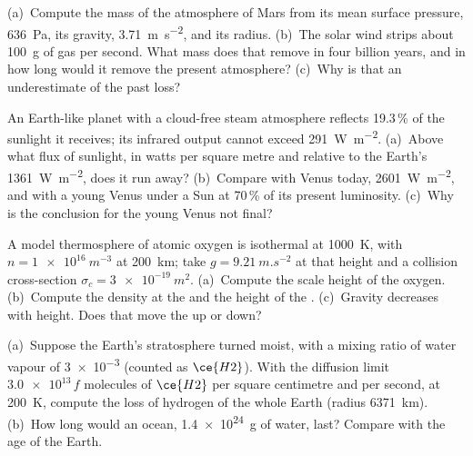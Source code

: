 \begin{exercise}[$\star\star$]\label{exo:b3:planetary-atmospheres:8}
(a)~Compute the mass of the atmosphere of Mars from its mean surface
pressure, \qty{636}{Pa}, its gravity, \qty{3.71}{m.s^{-2}}, and its
radius. (b)~The solar wind strips about \qty{100}{g} of gas per second.
What mass does that remove in four billion years, and in how long would
it remove the present atmosphere? (c)~Why is that an underestimate of the
past loss?
\end{exercise}

\begin{exercise}[$\star\star$]\label{exo:b3:planetary-atmospheres:9}
An Earth-like planet with a cloud-free steam atmosphere reflects 19.3\,\%
of the sunlight it receives; its infrared output cannot exceed
\qty{291}{W.m^{-2}}. (a)~Above what flux of sunlight, in watts per square
metre and relative to the Earth's \qty{1361}{W.m^{-2}}, does it run away?
(b)~Compare with Venus today, \qty{2601}{W.m^{-2}}, and with a young Venus
under a Sun at 70\,\% of its present luminosity. (c)~Why is the
conclusion for the young Venus not final?
\end{exercise}

\begin{exercise}[$\star\star\star$]\label{exo:b3:planetary-atmospheres:10}
A model thermosphere of atomic oxygen is isothermal at \qty{1000}{K}, with
$n = \qty{1e16}{m^{-3}}$ at \qty{200}{km}; take $g =
\qty{9.21}{m.s^{-2}}$ at that height and a collision cross-section
$\sigma_c = \qty{3e-19}{m^2}$. (a)~Compute the scale height of the oxygen.
(b)~Compute the density at the  and the height of the .
(c)~Gravity decreases with height. Does that move the  up or
down?
\end{exercise}

\begin{exercise}[$\star\star\star$]\label{exo:b3:planetary-atmospheres:11}
(a)~Suppose the Earth's stratosphere turned moist, with a mixing ratio of
water vapour of \num{3e-3} (counted as $\ce{H2}$). With the diffusion
limit $\num{3.0e13}\,f$ molecules of $\ce{H2}$ per square centimetre and
per second, at \qty{200}{K}, compute the loss of hydrogen of the whole
Earth (radius \qty{6371}{km}). (b)~How long would an ocean,
\qty{1.4e24}{g} of water, last? Compare with the age of the Earth.
\end{exercise}

